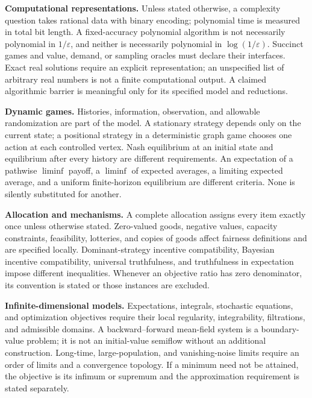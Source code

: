 \documentclass[11pt,a4paper]{article}
\begin{document}
\textbf{Computational representations.} Unless stated otherwise, a complexity
question takes rational data with binary encoding; polynomial time is measured
in total bit length. A fixed-accuracy polynomial algorithm is not necessarily
polynomial in $1/\varepsilon$, and neither is necessarily polynomial in
$\log(1/\varepsilon)$. Succinct games and value, demand, or sampling oracles
must declare their interfaces. Exact real solutions require an explicit
representation; an unspecified list of arbitrary real numbers is not a
finite computational output. A claimed algorithmic barrier is meaningful
only for its specified model and reductions.

\textbf{Dynamic games.} Histories, information, observation, and allowable
randomization are part of the model. A stationary strategy depends only on
the current state; a positional strategy in a deterministic graph game
chooses one action at each controlled vertex. Nash equilibrium at an initial
state and equilibrium after every history are different requirements.
An expectation of a pathwise $\liminf$ payoff, a $\liminf$ of expected averages,
a limiting expected average, and a uniform finite-horizon equilibrium are
different criteria. None is silently substituted for another.

\textbf{Allocation and mechanisms.} A complete allocation assigns every item
exactly once unless otherwise stated. Zero-valued goods, negative values,
capacity constraints, feasibility, lotteries, and copies of goods affect
fairness definitions and are specified locally. Dominant-strategy incentive
compatibility, Bayesian incentive compatibility, universal truthfulness,
and truthfulness in expectation impose different inequalities. Whenever
an objective ratio has zero denominator, its convention is stated or those
instances are excluded.

\textbf{Infinite-dimensional models.} Expectations, integrals, stochastic
equations, and optimization objectives require their local regularity,
integrability, filtrations, and admissible domains. A backward--forward
mean-field system is a boundary-value problem; it is not an initial-value
semiflow without an additional construction. Long-time, large-population,
and vanishing-noise limits require an order of limits and a convergence
topology. If a minimum need not be attained, the objective is its infimum
or supremum and the approximation requirement is stated separately.
\end{document}

